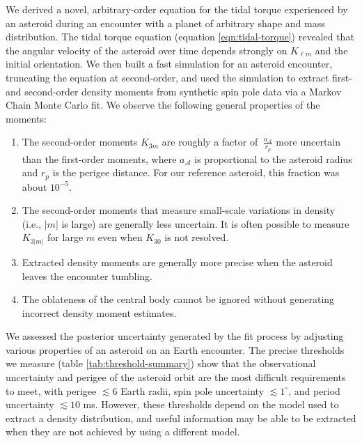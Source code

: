 \documentclass[fleqn,usenatbib]{mnras}
\begin{document}
We derived a novel, arbitrary-order equation for the tidal torque experienced by an asteroid during an encounter with a planet of arbitrary shape and mass distribution. The tidal torque equation (equation \ref{eqn:tidal-torque}) revealed that the angular velocity of the asteroid over time depends strongly on $K_{\ell m}$ and the initial orientation. We then built a fast simulation for an asteroid encounter, truncating the equation at second-order, and used the simulation to extract first- and second-order density moments from synthetic spin pole data via a Markov Chain Monte Carlo fit. We observe the following general properties of the moments:
\begin{enumerate}
  \item The second-order moments $K_{3m}$ are roughly a factor of $~\frac{a_\mathcal{A}}{r_p}$ more uncertain than the first-order moments, where $a_\mathcal{A}$ is proportional to the asteroid radius and $r_p$ is the perigee distance. For our reference asteroid, this fraction was about $10^{-5}$.
  \item The second-order moments that measure small-scale variations in density (i.e., $|m|$ is large) are generally less uncertain. It is often possible to measure $K_{3|m|}$ for large $m$ even when $K_{30}$ is not resolved.
  \item Extracted density moments are generally more precise when the asteroid leaves the encounter tumbling.
  \item The oblateness of the central body cannot be ignored without generating incorrect density moment estimates.
\end{enumerate}

We assessed the posterior uncertainty generated by the fit process by adjusting various properties of an asteroid on an Earth encounter. The precise thresholds we measure (table \ref{tab:threshold-summary}) show that the observational uncertainty and perigee of the asteroid orbit are the most difficult requirements to meet, with perigee $\lesssim 6$ Earth radii, spin pole uncertainty $\lesssim 1^\circ$, and period uncertainty $\lesssim 10$ ms. However, these thresholds depend on the model used to extract a density distribution, and useful information may be able to be extracted when they are not achieved by using a different model.
\end{document}
